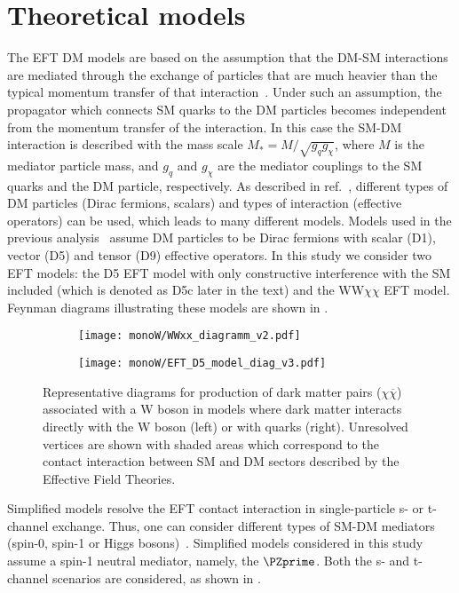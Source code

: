 \section{Theoretical models}

The EFT DM models are based on the assumption that 
the DM-SM interactions are mediated through the exchange of particles that are much heavier than the typical momentum transfer of that interaction~\cite{arXiv:1512.00476}.
Under such an assumption, the propagator which connects SM quarks to the DM particles becomes independent from the momentum transfer of the interaction. In this case the SM-DM interaction is described with the mass scale $M_{*} = M/\sqrt{g_q g_{\chi}}$, where $M$ is the mediator particle mass, and $g_q$ and $g_{\chi}$ are the mediator couplings to the SM quarks and the DM particle, respectively. As described in ref.~\cite{dm_eft_models}, different types of DM particles (Dirac fermions, scalars) and types of interaction (effective operators) can be used, which leads to many different models.
Models used in the previous analysis~\cite{wprime_8TeV} assume DM particles to be Dirac fermions with scalar (D1), vector (D5) and tensor (D9) effective operators.
In this study we consider two EFT models: the D5 EFT model with only constructive interference with the SM included (which is denoted as D5c later in the text) and the WW$\chi\chi$ EFT model.
Feynman diagrams illustrating these models are shown in .

\begin{figure}[]

\centering
\begin{subfigure}{.5\textwidth}
  \centering
  \texttt{[image: monoW/WWxx\_diagramm\_v2.pdf]}
\end{subfigure}%
\begin{subfigure}{.5\textwidth}
  \centering
  \texttt{[image: monoW/EFT\_D5\_model\_diag\_v3.pdf]}
\end{subfigure}
  \caption{Representative diagrams for production of dark matter pairs ($\chi\overline{\chi}$) associated with a W boson in models where
dark matter interacts directly with the W boson (left) or with quarks (right).
Unresolved vertices are shown with shaded areas which correspond to the 
contact interaction between SM and DM sectors described by the Effective Field Theories.
}
  \label{fig:feynMonoWEFT}
\end{figure}

Simplified models resolve the EFT contact interaction in single-particle 
s- or t-channel exchange. Thus, one can consider different types of SM-DM mediators (spin-0, spin-1 or Higgs bosons)~\cite{dm_simplified_models}.
Simplified models considered in this study assume a spin-1 neutral mediator, namely, the $\PZprime$. Both the s- and t-channel scenarios are considered, as shown in .

